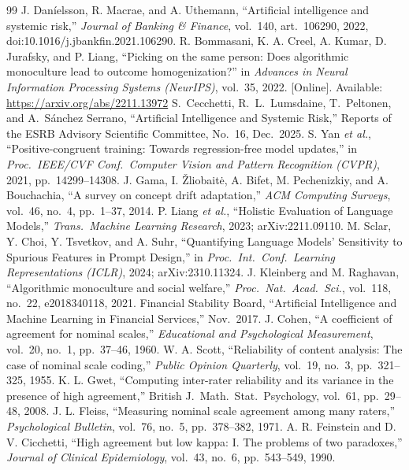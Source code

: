 \documentclass{ieeeaccess}
\begin{document}
\begin{thebibliography}{99}
 J. Dan\'ielsson, R. Macrae, and A. Uthemann, ``Artificial intelligence and systemic risk,'' \emph{Journal of Banking \& Finance}, vol.~140, art.~106290, 2022, doi:10.1016/j.jbankfin.2021.106290.
 R. Bommasani, K. A. Creel, A. Kumar, D. Jurafsky, and P. Liang, ``Picking on the same person: Does algorithmic monoculture lead to outcome homogenization?'' in \emph{Advances in Neural Information Processing Systems (NeurIPS)}, vol.~35, 2022. [Online]. Available: \url{https://arxiv.org/abs/2211.13972}
 S.\ Cecchetti, R.\ L.\ Lumsdaine, T.\ Peltonen, and A.\ S\'anchez Serrano, ``Artificial Intelligence and Systemic Risk,'' Reports of the ESRB Advisory Scientific Committee, No.~16, Dec.\ 2025.
 S. Yan \emph{et al.}, ``Positive-congruent training: Towards regression-free model updates,'' in \emph{Proc.\ IEEE/CVF Conf.\ Computer Vision and Pattern Recognition (CVPR)}, 2021, pp.~14299--14308.
 J. Gama, I. \v{Z}liobait\.{e}, A. Bifet, M. Pechenizkiy, and A. Bouchachia, ``A survey on concept drift adaptation,'' \emph{ACM Computing Surveys}, vol.~46, no.~4, pp.~1--37, 2014.
 P. Liang \emph{et al.}, ``Holistic Evaluation of Language Models,'' \emph{Trans.\ Machine Learning Research}, 2023; arXiv:2211.09110.
 M. Sclar, Y. Choi, Y. Tsvetkov, and A. Suhr, ``Quantifying Language Models' Sensitivity to Spurious Features in Prompt Design,'' in \emph{Proc.\ Int.\ Conf.\ Learning Representations (ICLR)}, 2024; arXiv:2310.11324.
 J. Kleinberg and M. Raghavan, ``Algorithmic monoculture and social welfare,'' \emph{Proc.\ Nat.\ Acad.\ Sci.}, vol.~118, no.~22, e2018340118, 2021.
 Financial Stability Board, ``Artificial Intelligence and Machine Learning in Financial Services,'' Nov.\ 2017.
 J. Cohen, ``A coefficient of agreement for nominal scales,'' \emph{Educational and Psychological Measurement}, vol.~20, no.~1, pp.~37--46, 1960.
 W. A. Scott, ``Reliability of content analysis: The case of nominal scale coding,'' \emph{Public Opinion Quarterly}, vol.~19, no.~3, pp.~321--325, 1955.
 K. L. Gwet, ``Computing inter-rater reliability and its variance in the presence of high agreement,'' British J.\ Math.\ Stat.\ Psychology, vol.~61, pp.~29--48, 2008.
 J. L. Fleiss, ``Measuring nominal scale agreement among many raters,'' \emph{Psychological Bulletin}, vol.~76, no.~5, pp.~378--382, 1971.
 A. R. Feinstein and D. V. Cicchetti, ``High agreement but low kappa: I. The problems of two paradoxes,'' \emph{Journal of Clinical Epidemiology}, vol.~43, no.~6, pp.~543--549, 1990.

\end{thebibliography}
\end{document}
